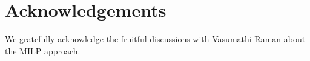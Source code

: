 \vspace{-10pt}
\section*{Acknowledgements}
We gratefully acknowledge the fruitful discussions with Vasumathi Raman about the MILP approach.